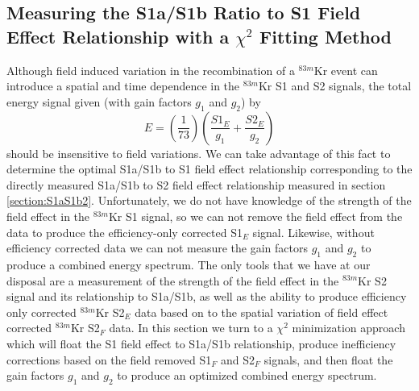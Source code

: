 \documentclass[a4paper,10pt,twocolumn]{article}
\begin{document}
\subsection{Measuring the S1a/S1b Ratio to S1 Field Effect Relationship with a $\chi^2$ Fitting Method} \label{section:S1relation2}

Although field induced variation in the recombination of a $^{83m}$Kr event can introduce a spatial and time dependence in the $^{83m}$Kr S1 and S2 signals, the total energy signal given (with gain factors $g_1$ and $g_2$) by 
\begin{equation} \label{CombinedEnergy}
E=\left(\frac{1}{73}\right)\left(\frac{S1_E}{g_1} + \frac{S2_E}{g_2}\right)
\end{equation}
should be insensitive to field variations.  We can take advantage of this fact to determine the optimal S1a/S1b to S1 field effect relationship corresponding to the directly measured S1a/S1b to S2 field effect relationship measured in section \ref{section:S1aS1b2}.  Unfortunately, we do not have knowledge of the strength of the field effect in the $^{83m}$Kr S1 signal, so we can not remove the field effect from the data to produce the efficiency-only corrected S1$_E$ signal.  Likewise, without efficiency corrected data we can not measure the gain factors $g_1$ and $g_2$ to produce a combined energy spectrum.  The only tools that we have at our disposal are a measurement of the strength of the field effect in the $^{83m}$Kr S2 signal and its relationship to S1a/S1b, as well as the ability to produce efficiency only corrected $^{83m}$Kr S2$_E$ data based on to the spatial variation of field effect corrected  $^{83m}$Kr S2$_F$ data.  In this section we turn to a $\chi^2$ minimization approach which will float the S1 field effect to S1a/S1b relationship, produce inefficiency corrections based on the field removed S1$_F$ and S2$_F$ signals, and then float the gain factors $g_1$ and $g_2$ to produce an optimized combined energy spectrum.  
\end{document}

